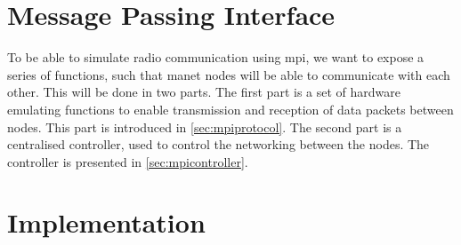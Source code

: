 \chapter{Message Passing Interface}

To be able to simulate radio communication using \gls{mpi}, we want to expose a series of functions, such that \gls{manet} nodes will be able to communicate with each other. This will be done in two parts. The first part is a set of hardware emulating functions to enable transmission and reception of data packets between nodes. This part is introduced in \autoref{sec:mpiprotocol}. The second part is a centralised controller, used to control the networking between the nodes. The controller is presented in \autoref{sec:mpicontroller}.




\chapter{Implementation}

%